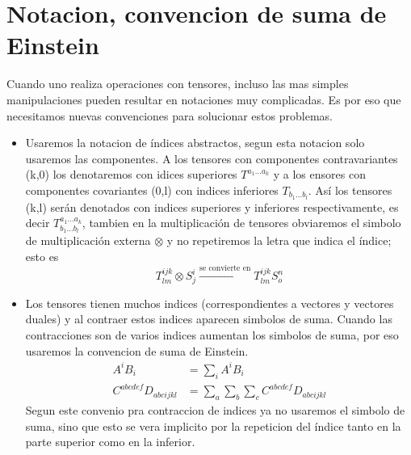 \documentclass[../Main.tex]{subfiles}
\begin{document}
\renewcommand{\thesection}{A\arabic{section}}
\renewcommand{\thetable}{A\arabic{section}.\arabic{table}}


\section{Notacion, convencion de suma de Einstein}
Cuando uno realiza operaciones con tensores, incluso las mas simples manipulaciones pueden resultar en notaciones muy complicadas. Es por eso que necesitamos nuevas convenciones para solucionar estos problemas.
\begin{itemize}
    \item Usaremos la notacion de índices abstractos, segun esta notacion solo usaremos las componentes. A los tensores con componentes contravariantes (k,0) los denotaremos con idices superiores $T^{a_{1}\dots a_{k}}$ y a los ensores con componentes covariantes (0,l) con indices inferiores $T_{b_{1}\dots b_{l}}$. Así los tensores (k,l) serán denotados con indices superiores y inferiores respectivamente, es decir $T^{a_{1}\dots a_{k}}_{b_{1}\dots b_{l}}$, tambien en la multiplicación de tensores obviaremos el simbolo de multiplicación externa $\otimes$ y no repetiremos la letra que indica el índice; esto es
    \begin{equation}
        T^{ijk}_{lm}\otimes S^{i}_{j} \xrightarrow{\text{se convierte en}} T^{ijk}_{lm}S^{n}_{o}
    \end{equation}
    \item Los tensores tienen muchos indices (correspondientes a vectores y vectores duales) y al contraer estos indices aparecen simbolos de suma. Cuando las contracciones son de varios indices aumentan los simbolos de suma, por eso usaremos la convencion de suma de Einstein.
    \begin{eqnarray}
        A^{i}B_{i} & = \sum_{i}A^{i}B_{i} \\
        C^{abcdef}D_{abcijkl} & = \sum_{a}\sum_{b}\sum_{c}C^{abcdef}D_{abcijkl}
    \end{eqnarray}
    Segun este convenio pra contraccion de indices ya no usaremos el simbolo de suma, sino que esto se vera implicito por la repeticion del índice tanto en la parte superior como en la inferior.
\end{itemize}
\end{document}
